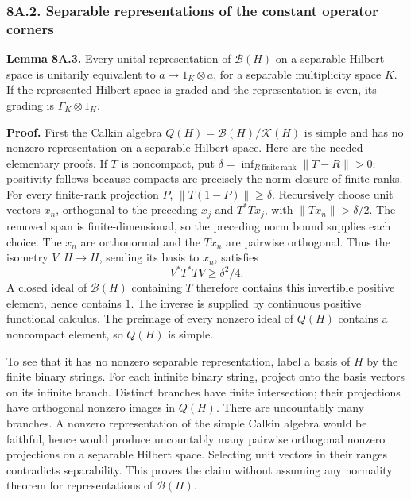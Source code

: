 \documentclass[
  11pt,
]{article}
\begin{document}
\subsubsection{8A.2. Separable representations of the constant operator
corners}\label{a.2.-separable-representations-of-the-constant-operator-corners}

\textbf{Lemma 8A.3.} Every unital representation of \(\mathcal B(H)\) on
a separable Hilbert space is unitarily equivalent to
\(a\mapsto1_K\otimes a\), for a separable multiplicity space \(K\). If
the represented Hilbert space is graded and the representation is even,
its grading is \(\Gamma_K\otimes1_H\).

\textbf{Proof.} First the Calkin algebra
\(Q(H)=\mathcal B(H)/\mathcal K(H)\) is simple and has no nonzero
representation on a separable Hilbert space. Here are the needed
elementary proofs. If \(T\) is noncompact, put
\(\delta=\inf_{R\ \mathrm{finite\ rank}}\|T-R\|>0\); positivity follows
because compacts are precisely the norm closure of finite ranks. For
every finite-rank projection \(P\), \(\|T(1-P)\|\geq\delta\).
Recursively choose unit vectors \(x_n\), orthogonal to the preceding
\(x_j\) and \(T^*Tx_j\), with \(\|Tx_n\|>\delta/2\). The removed span is
finite-dimensional, so the preceding norm bound supplies each choice.
The \(x_n\) are orthonormal and the \(Tx_n\) are pairwise orthogonal.
Thus the isometry \(V:H\to H\), sending its basis to \(x_n\), satisfies
\[
 V^*T^*TV\geq\delta^2/4.
\] A closed ideal of \(\mathcal B(H)\) containing \(T\) therefore
contains this invertible positive element, hence contains \(1\). The
inverse is supplied by continuous positive functional calculus. The
preimage of every nonzero ideal of \(Q(H)\) contains a noncompact
element, so \(Q(H)\) is simple.

To see that it has no nonzero separable representation, label a basis of
\(H\) by the finite binary strings. For each infinite binary string,
project onto the basis vectors on its infinite branch. Distinct branches
have finite intersection; their projections have orthogonal nonzero
images in \(Q(H)\). There are uncountably many branches. A nonzero
representation of the simple Calkin algebra would be faithful, hence
would produce uncountably many pairwise orthogonal nonzero projections
on a separable Hilbert space. Selecting unit vectors in their ranges
contradicts separability. This proves the claim without assuming any
normality theorem for representations of \(\mathcal B(H)\).
\end{document}
